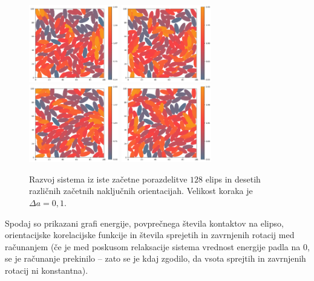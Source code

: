 \begin{figure}[!ht]
    \includegraphics[width=0.35\textwidth]{./figures/runs/delta_a_01/run07}
    \includegraphics[width=0.35\textwidth]{./figures/runs/delta_a_01/run08}
    \includegraphics[width=0.35\textwidth]{./figures/runs/delta_a_01/run09}
    \includegraphics[width=0.35\textwidth]{./figures/runs/delta_a_01/run10}
    \caption{Razvoj sistema iz iste začetne porazdelitve $128$ elips in desetih različnih
    začetnih naključnih orientacijah. Velikost koraka je $\Delta a = 0,1$.}
    \label{fig:delta_a_01}
\end{figure}
Spodaj so prikazani grafi energije, povprečnega števila kontaktov na elipso, orientacijske
korelacijske funkcije in števila sprejetih in zavrnjenih rotacij med računanjem 
(če je med poskusom relaksacije sistema vrednost energije padla na $0$, se je računanje 
prekinilo -- zato se je kdaj zgodilo, da vsota sprejtih in zavrnjenih rotacij ni konstantna).
